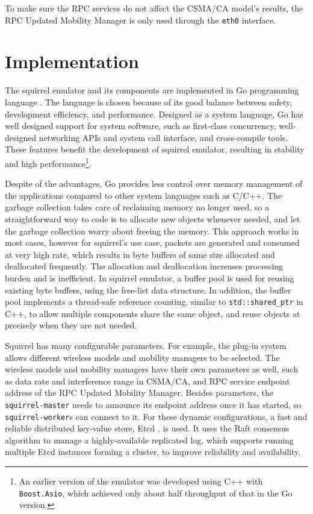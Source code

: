 \documentclass[12pt]{report}
\begin{document}
To make sure the RPC services do not affect the CSMA/CA model's results, the RPC Updated Mobility Manager is only used through the \texttt{eth0} interface.

\section{Implementation}
\label{sec:squirrel_implementation}

The squirrel emulator and its components are implemented in Go programming language \cite{golang}. The language is chosen because of its good balance between safety, development efficiency, and performance. Designed as a system language, Go has well designed support for system software, such as first-class concurrency, well-designed networking APIs and system call interface, and cross-compile tools. These features benefit the development of squirrel emulator, resulting in stability and high performance\footnote{An earlier version of the emulator was developed using C++ with \texttt{Boost.Asio}, which achieved only about half throughput of that in the Go version.}.

Despite of the advantages, Go provides less control over memory management of the applications compared to other system languages such as C/C++. The garbage collection takes care of reclaiming memory no longer used, so a straightforward way to code is to allocate new objects whenever needed, and let the garbage collection worry about freeing the memory. This approach works in most cases, however for squirrel's use case, packets are generated and consumed at very high rate, which results in byte buffers of same size allocated and deallocated frequently. The allocation and deallocation increases processing burden and is inefficient. In squirrel emulator, a buffer pool is used for reusing existing byte buffers, using the free-list data structure. In addition, the buffer pool implements a thread-safe reference counting, similar to \texttt{std::shared\_ptr} in C++, to allow multiple components share the same object, and reuse objects at precisely when they are not needed.

Squirrel has many configurable parameters. For example, the plug-in system allows different wireless models and mobility managers to be selected. The wireless models and mobility managers have their own parameters as well, such as data rate and interference range in CSMA/CA, and RPC service endpoint address of the RPC Updated Mobility Manager. Besides parameters, the \texttt{squirrel-master} needs to announce its endpoint address once it has started, so \texttt{squirrel-worker}s can connect to it. For these dynamic configurations, a fast and reliable distributed key-value store, Etcd \cite{etcd}, is used. It uses the Raft consensus algorithm \cite{ongaro2014search} to manage a highly-available replicated log, which supports running multiple Etcd instances forming a cluster, to improve reliability and availability.
\end{document}
